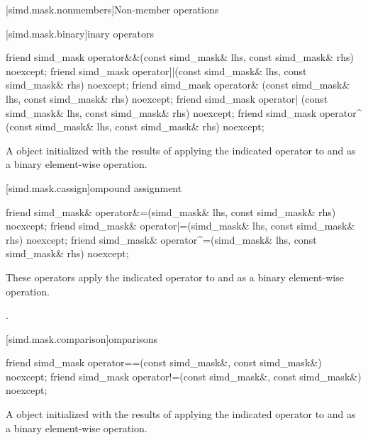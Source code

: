 [simd.mask.nonmembers]{Non-member operations}

[simd.mask.binary]{\texorpdfstring{inary}{simd_mask binary} operators}

\begin{itemdecl}
friend simd_mask operator&&(const simd_mask& lhs, const simd_mask& rhs) noexcept;
friend simd_mask operator||(const simd_mask& lhs, const simd_mask& rhs) noexcept;
friend simd_mask operator& (const simd_mask& lhs, const simd_mask& rhs) noexcept;
friend simd_mask operator| (const simd_mask& lhs, const simd_mask& rhs) noexcept;
friend simd_mask operator^ (const simd_mask& lhs, const simd_mask& rhs) noexcept;
\end{itemdecl}

\begin{itemdescr}
  \pnum\returns
  A  object initialized with the results of applying the indicated operator to  and  as a binary element-wise operation.
\end{itemdescr}

[simd.mask.cassign]{\texorpdfstring{ompound}{simd_mask compound} assignment}

\begin{itemdecl}
friend simd_mask& operator&=(simd_mask& lhs, const simd_mask& rhs) noexcept;
friend simd_mask& operator|=(simd_mask& lhs, const simd_mask& rhs) noexcept;
friend simd_mask& operator^=(simd_mask& lhs, const simd_mask& rhs) noexcept;
\end{itemdecl}

\begin{itemdescr}
  \pnum\effects
  These operators apply the indicated operator to  and  as a binary element-wise operation.

  \pnum\returns
  .
\end{itemdescr}

[simd.mask.comparison]{\texorpdfstring{omparisons}{simd_mask comparisons}}

\begin{itemdecl}
friend simd_mask operator==(const simd_mask&, const simd_mask&) noexcept;
friend simd_mask operator!=(const simd_mask&, const simd_mask&) noexcept;
\end{itemdecl}

\begin{itemdescr}
  \pnum\returns
  A  object initialized with the results of applying the indicated operator to  and  as a binary element-wise operation.
\end{itemdescr}

